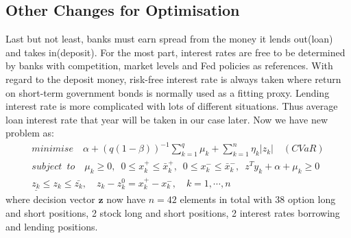 \subsection{Other Changes for Optimisation}
Last but not least, banks must earn spread from the money it lends out(loan) and takes in(deposit). For the most part, interest rates are free to be determined by banks with competition, market levels and Fed policies as references. With regard to the deposit money, risk-free interest rate is always taken where return on short-term government bonds is normally used as a fitting proxy. Lending interest rate is more complicated with lots of different situations. Thus average loan interest rate that year will be taken in our case later. Now we have new problem as:
\begin{align} 
minimise \quad \alpha+(q(1-\beta))^{-1}\sum_{k=1}^{q}\mu_k+\sum_{k=1}^n\eta_k|z_k| \quad(CVaR)\nonumber 
\\ subject \enspace to \quad \mu_k\geq0,\enspace 0\leq x_k^+\leq\bar{x}_k^+, \enspace 0\leq x_k^-\leq\bar{x}_k^-,\enspace z^Ty_k+\alpha+\mu_k\geq0\nonumber
\\\underline{z_k}\leq z_k\leq\bar{z_k},\quad z_k-z_k^0=x_k^+-x_k^-, \quad k=1,\cdots,n
\end{align}
where decision vector $\textbf{z}$ now have $n=42$ elements in total with 38 option long and short positions, 2 stock long and short positions, 2 interest rates borrowing and lending positions. 
